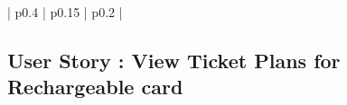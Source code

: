 \documentclass[a4paper,12pt]{report}
\begin{document}
\begin{longtable}{!{\color{blue}\vrule width 5pt} p{0.4\linewidth} | p{0.15\linewidth} | p{0.2\linewidth} !{\color{blue}\vrule width 5pt} }
	 \\ %
	
	\hline
	
	
	\noalign{\global\arrayrulewidth=1mm}
	\hline
	\noalign{\global\arrayrulewidth=0.5mm}
	\hline	
	
\end{longtable}






\vspace{2cm}
\subsection{User Story : View Ticket Plans for Rechargeable card}
\end{document}
